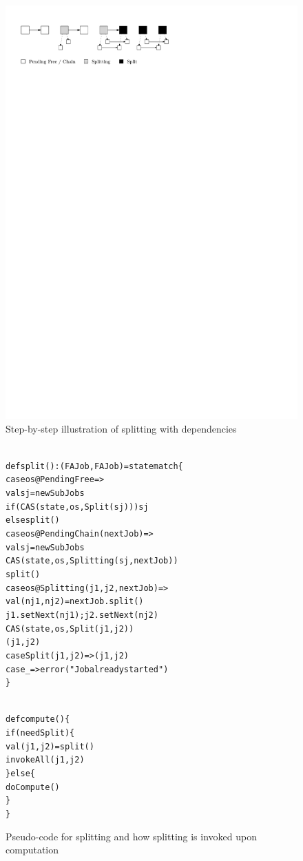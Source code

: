 \documentclass[runningheads,a4paper,fleqn]{llncs}
\begin{document}
\begin{figure}
  \centering
  \includegraphics[trim = 0mm 18mm 0mm 0mm, clip]{split}
  \caption{Step-by-step illustration of splitting with dependencies}
  \label{fig:split-ill}
\end{figure}

\begin{figure}
\begin{minipage}[t]{7cm}
\begin{alltt}
{\scriptsize
def split(): (FAJob, FAJob) = state match \{
  case os@PendingFree =>
    val sj = newSubJobs
    if (CAS(state, os, Split(sj))) sj
    else split()
  case os@PendingChain(nextJob) =>
    val sj = newSubJobs
    CAS(state, os, Splitting(sj, nextJob))
    split()
  case os@Splitting(j1, j2, nextJob) =>
    val (nj1, nj2) = nextJob.split()
    j1.setNext(nj1); j2.setNext(nj2)
    CAS(state, os, Split(j1, j2))
    (j1, j2)
  case Split(j1, j2) => (j1, j2)
  case _ => error("Job already started")
\}
}
\end{alltt}
\end{minipage}
\begin{minipage}[t]{4cm}
\begin{alltt}
{\scriptsize
def compute() \{
  if (needSplit) \{
    val (j1, j2) = split()
    invokeAll(j1, j2)
  \} else \{
    doCompute()
  \}
\}
}
\end{alltt}
\end{minipage}
\caption{Pseudo-code for splitting and how splitting is invoked upon
  computation}
\label{fig:split-code}
\end{figure}
\end{document}

